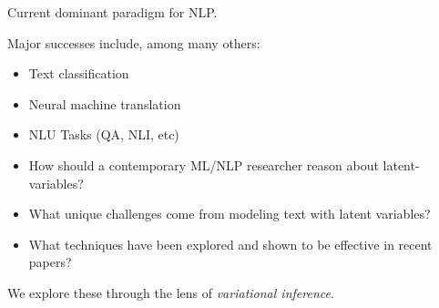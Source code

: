 \begin{frame}
    Current dominant paradigm for NLP.
    \vspace{0.5cm}

    Major successes include, among many others:
    \begin{itemize}
        \item Text classification  \cite{}  
        \item Neural machine translation \cite{} 
        \item NLU Tasks (QA, NLI, etc) \cite{}
    \end{itemize}
\end{frame}

\begin{frame}{}
    \begin{itemize}
        \item 

    How should a contemporary ML/NLP researcher reason about latent-variables?
    \vspace{0.5cm}

        \item 
   
    What unique challenges come from modeling text with latent variables?   

    \vspace{0.5cm}

        \item 
   
    What techniques have been explored and shown to be effective in recent papers? 
    \end{itemize}
 

   
    \pause
    \air
    
    We explore these through the lens of \textit{variational inference}.    
\end{frame}



